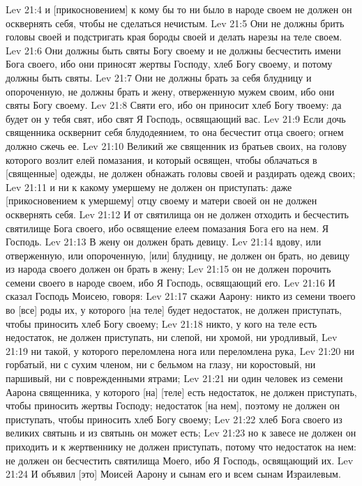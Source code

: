 Lev 21:4  и [прикосновением] к кому бы то ни было в народе своем не должен он осквернять себя, чтобы не сделаться нечистым.
Lev 21:5  Они не должны брить головы своей и подстригать края бороды своей и делать нарезы на теле своем.
Lev 21:6  Они должны быть святы Богу своему и не должны бесчестить имени Бога своего, ибо они приносят жертвы Господу, хлеб Богу своему, и потому должны быть святы.
Lev 21:7  Они не должны брать за себя блудницу и опороченную, не должны брать и жену, отверженную мужем своим, ибо они святы Богу своему.
Lev 21:8  Святи его, ибо он приносит хлеб Богу твоему: да будет он у тебя свят, ибо свят Я Господь, освящающий вас.
Lev 21:9  Если дочь священника осквернит себя блудодеянием, то она бесчестит отца своего; огнем должно сжечь ее.
Lev 21:10  Великий же священник из братьев своих, на голову которого возлит елей помазания, и который освящен, чтобы облачаться в [священные] одежды, не должен обнажать головы своей и раздирать одежд своих;
Lev 21:11  и ни к какому умершему не должен он приступать: даже [прикосновением к умершему] отцу своему и матери своей он не должен осквернять себя.
Lev 21:12  И от святилища он не должен отходить и бесчестить святилище Бога своего, ибо освящение елеем помазания Бога его на нем. Я Господь.
Lev 21:13  В жену он должен брать девицу.
Lev 21:14  вдову, или отверженную, или опороченную, [или] блудницу, не должен он брать, но девицу из народа своего должен он брать в жену;
Lev 21:15  он не должен порочить семени своего в народе своем, ибо Я Господь, освящающий его.
Lev 21:16  И сказал Господь Моисею, говоря:
Lev 21:17  скажи Аарону: никто из семени твоего во [все] роды их, у которого [на теле] будет недостаток, не должен приступать, чтобы приносить хлеб Богу своему;
Lev 21:18  никто, у кого на теле есть недостаток, не должен приступать, ни слепой, ни хромой, ни уродливый,
Lev 21:19  ни такой, у которого переломлена нога или переломлена рука,
Lev 21:20  ни горбатый, ни с сухим членом, ни с бельмом на глазу, ни коростовый, ни паршивый, ни с поврежденными ятрами;
Lev 21:21  ни один человек из семени Аарона священника, у которого [на] [теле] есть недостаток, не должен приступать, чтобы приносить жертвы Господу; недостаток [на нем], поэтому не должен он приступать, чтобы приносить хлеб Богу своему;
Lev 21:22  хлеб Бога своего из великих святынь и из святынь он может есть;
Lev 21:23  но к завесе не должен он приходить и к жертвеннику не должен приступать, потому что недостаток на нем: не должен он бесчестить святилища Моего, ибо Я Господь, освящающий их.
Lev 21:24  И объявил [это] Моисей Аарону и сынам его и всем сынам Израилевым.
